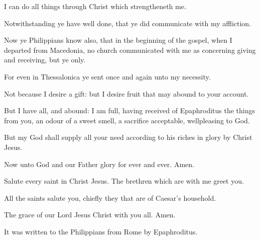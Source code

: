 {I can
do all
things
through
Christ
which
strengtheneth
me.

Notwithstanding ye
have
well
done, that ye did
communicate
with
my
affliction.

Now
ye
Philippians
know
also,
that
in the
beginning of the
gospel,
when I
departed
from
Macedonia,
no
church communicated
with
me
as
concerning
giving
and
receiving,
but
ye
only.

For
even
in
Thessalonica ye
sent
once
and
again
unto
my
necessity.

Not
because I
desire a
gift:
but I
desire
fruit that may
abound
to
your
account.

But I
have
all,
and
abound: I am
full, having
received
of
Epaphroditus the
things
{}
from
you, an
odour of a sweet
smell, a
sacrifice
acceptable,
wellpleasing to
God.

But
my
God shall
supply
all
your
need according
to
his
riches
in
glory
by
Christ
Jesus.

Now unto
God
and
our
Father
{}
glory
for
ever and
ever.
Amen.


\par }{\PP {}Salute
every
saint
in
Christ
Jesus. The brethren which
are
with
me
greet
you.

All the
saints
salute
you,
chiefly they that
are
of
Caesar’s
household.

The
grace
of
our
Lord
Jesus
Christ
{}
with
you
all.
Amen.


\par }{\SH It was written to the Philippians from Rome by Epaphroditus.
\par }
